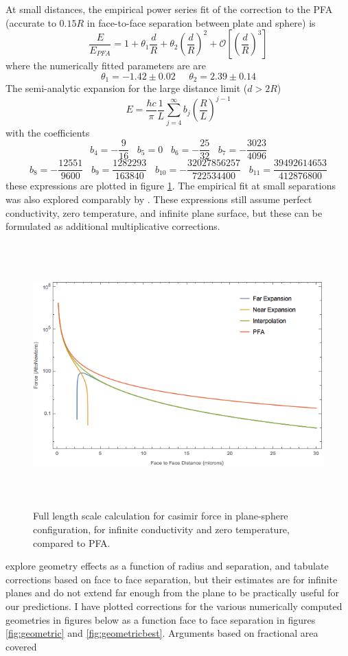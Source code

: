 \documentclass[11pt,traditabstract]{article}
\begin{document}
At small distances, the empirical power series fit of the correction to the PFA (accurate to $0.15R$ in face-to-face separation between plate and sphere) is
$$
\frac{E}{E_{PFA}}=1+\theta_1\frac{d}{R}+\theta_2\left(\frac{d}{R}\right)^2+\mathcal{O}\left[\left(\frac{d}{R}\right)^3\right]
$$
where the numerically fitted parameters are \citep{Emig07} are
$$
\theta_1=-1.42\pm0.02 \;\;\;\;\; \theta_2=2.39\pm0.14
$$
The semi-analytic expansion for the large distance limit ($d>2R$)
$$
E=\frac{\hbar c}{\pi}\frac{1}{L}\sum_{j=4}^\infty b_j\left(\frac{R}{L}\right)^{j-1}
$$
with the coefficients
$$
b_4=-\frac{9}{16} \;\;\; b_5=0 \;\;\; b_6=-\frac{25}{32} \;\;\; b_7=-\frac{3023}{4096}
$$
$$
b_8=-\frac{12551}{9600} \;\;\; b_9=\frac{1282293}{163840} \;\;\; b_{10}=-\frac{32027856257}{722534400} \;\;\; b_{11}=\frac{39492614653}{412876800}
$$
these expressions are plotted in figure \ref{fig:expansion}. The empirical fit at small separations was also explored comparably by \citet{BeyondPFA}. These expressions still assume perfect conductivity, zero temperature, and infinite plane surface, but these can be formulated as additional multiplicative corrections.

\begin{figure}[!h]
\centering
\includegraphics[height=4in]{analytical}
\caption{Full length scale calculation for casimir force in plane-sphere configuration, for infinite conductivity and zero temperature, compared to PFA.}\label{fig:expansion}
\end{figure}

\citet{Durand} explore geometry effects as a function of radius and separation, and tabulate corrections based on face to face separation, but their estimates are for infinite planes and do not extend far enough from the plane to be practically useful for our predictions. I have plotted corrections for the various numerically computed geometries in figures below as a function face to face separation in figures \ref{fig:geometric} and \ref{fig:geometricbest}. Arguments based on fractional area covered  
\end{document}
